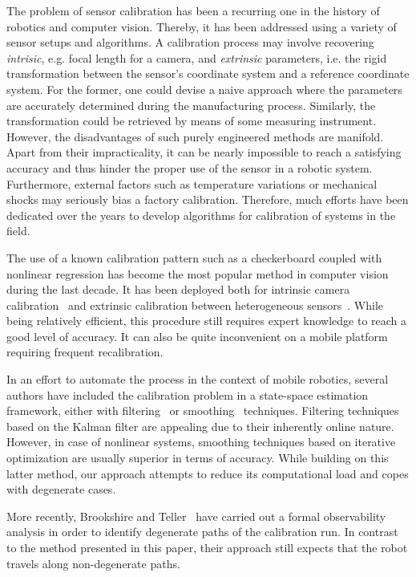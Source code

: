 The problem of sensor calibration has been a recurring one in the history of
robotics and computer vision. Thereby, it has been addressed using a
variety of sensor setups and algorithms. A calibration process may involve
recovering \emph{intrisic}, e.g. focal length for a camera, and \emph{extrinsic}
parameters, i.e. the rigid transformation between the sensor's coordinate system
and a reference coordinate system. For the former, one could devise a naive
approach where the parameters are accurately determined during the manufacturing
process. Similarly, the transformation could be retrieved by means of
some measuring instrument. However, the disadvantages of such purely
engineered methods are manifold. Apart from their impracticality, it can be
nearly impossible to reach a satisfying accuracy and thus hinder the proper use
of the sensor in a robotic system. Furthermore, external factors such as
temperature variations or mechanical shocks may seriously bias a factory
calibration. Therefore, much efforts have been dedicated over the years to
develop algorithms for calibration of systems in the field.

The use of a known calibration pattern such as a checkerboard coupled with
nonlinear regression has become the most popular method in computer vision
during the last decade. It has been deployed both for intrinsic camera
calibration~\cite{sturm99plane} and extrinsic calibration
between heterogeneous sensors~\cite{zhang04extrinsic}. While being relatively
efficient, this procedure still requires expert knowledge to reach a good level
of accuracy. It can also be quite inconvenient on a mobile platform requiring
frequent recalibration.

In an effort to automate the process in the context of mobile robotics, several
authors have included the calibration problem in a state-space estimation
framework, either with filtering~\cite{martinelli06automatic} or
smoothing~\cite{kuemmerle11simultaneous} techniques. Filtering techniques based
on the Kalman filter are appealing due to their inherently online nature.
However, in case of nonlinear systems, smoothing techniques based on iterative
optimization are usually superior in terms of accuracy. While building on this
latter method, our approach attempts to reduce its computational load and copes
with degenerate cases.

More recently, Brookshire and Teller~\cite{brookshire12extrinsic} have carried
out a formal observability analysis in order to identify degenerate paths of
the calibration run. In contrast to the method presented in this paper, their
approach still expects that the robot travels along non-degenerate paths.

